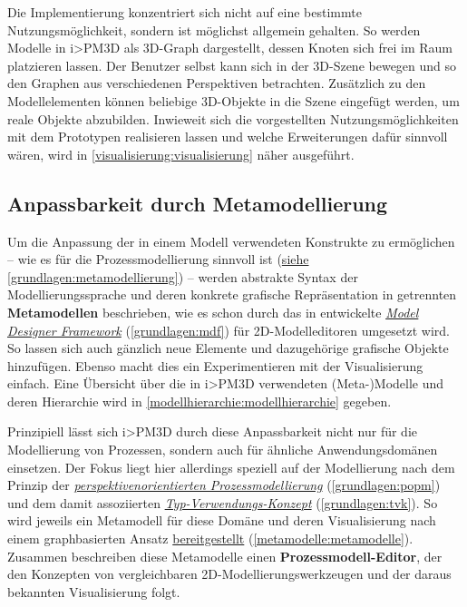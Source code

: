 \documentclass[a4paper,10pt]{sphinxmanual}
\begin{document}
Die Implementierung konzentriert sich nicht auf eine bestimmte Nutzungsmöglichkeit, sondern ist möglichst allgemein gehalten.
So werden Modelle in i\textgreater{}PM3D als 3D-Graph dargestellt, dessen Knoten sich frei im Raum platzieren lassen.
Der Benutzer selbst kann sich in der 3D-Szene bewegen und so den Graphen aus verschiedenen Perspektiven betrachten.
Zusätzlich zu den Modellelementen können beliebige 3D-Objekte in die Szene eingefügt werden, um reale Objekte abzubilden.
Inwieweit sich die vorgestellten Nutzungsmöglichkeiten mit dem Prototypen realisieren lassen und welche Erweiterungen dafür sinnvoll wären, wird in \autoref*{visualisierung:visualisierung} näher ausgeführt.


\subsection{Anpassbarkeit durch Metamodellierung}
\label{einleitung:anpassbarkeit-durch-metamodellierung}
Um die Anpassung der in einem Modell verwendeten Konstrukte zu ermöglichen – wie es für die Prozessmodellierung sinnvoll ist ({\hyperref[grundlagen:metamodellierung]{siehe}} \autoref*{grundlagen:metamodellierung}) – werden abstrakte Syntax der Modellierungssprache und deren konkrete grafische Repräsentation in getrennten \textbf{Metamodellen} beschrieben, wie es schon durch das in \cite{roth_konzeption_2011} entwickelte {\hyperref[grundlagen:mdf]{\emph{Model Designer Framework}}} (\autoref*{grundlagen:mdf}) für 2D-Modelleditoren umgesetzt wird.
So lassen sich auch gänzlich neue Elemente und dazugehörige grafische Objekte hinzufügen. Ebenso macht dies ein Experimentieren mit der Visualisierung einfach.
Eine Übersicht über die in i\textgreater{}PM3D verwendeten (Meta-)Modelle und deren Hierarchie wird in \autoref*{modellhierarchie:modellhierarchie} gegeben.

Prinzipiell lässt sich i\textgreater{}PM3D durch diese Anpassbarkeit nicht nur für die Modellierung von Prozessen, sondern auch für ähnliche Anwendungsdomänen einsetzen.
Der Fokus liegt hier allerdings speziell auf der Modellierung nach dem Prinzip der {\hyperref[grundlagen:popm]{\emph{perspektivenorientierten Prozessmodellierung}}} (\autoref*{grundlagen:popm}) und dem damit assoziierten {\hyperref[grundlagen:tvk]{\emph{Typ-Verwendungs-Konzept}}} (\autoref*{grundlagen:tvk}).
So wird jeweils ein Metamodell für diese Domäne und deren Visualisierung nach einem graphbasierten Ansatz {\hyperref[metamodelle:metamodelle]{bereitgestellt}} (\autoref*{metamodelle:metamodelle}).
Zusammen beschreiben diese Metamodelle einen \textbf{Prozessmodell-Editor}, der den Konzepten von vergleichbaren 2D-Modellierungswerkzeugen und der daraus bekannten Visualisierung folgt.
\end{document}
